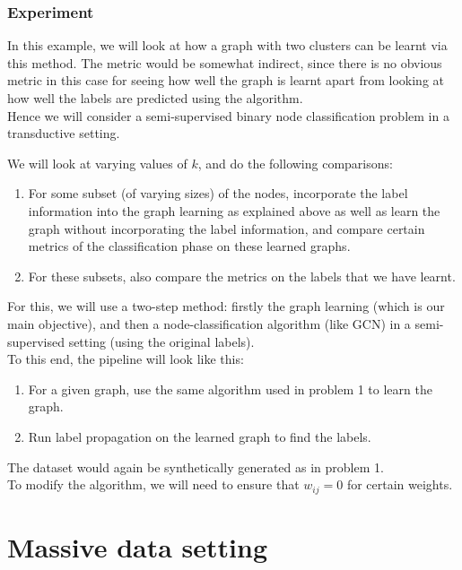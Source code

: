 \documentclass[a4paper]{article}
\newcommand{\nl}{\vspace{0.2cm}\\}
\begin{document}
\subsubsection{Experiment}

In this example, we will look at how a graph with two clusters can be learnt via this method. The metric would be somewhat indirect, since there is no obvious metric in this case for seeing how well the graph is
learnt apart from looking at how well the labels are predicted using the algorithm.\nl
Hence we will consider a semi-supervised binary node classification problem in a transductive setting.

We will look at varying values of $k$, and do the following comparisons:

\begin{enumerate}
    \item For some subset (of varying sizes) of the nodes, incorporate the label information into the graph learning as explained above as well as learn the graph without incorporating the
        label information, and compare certain metrics of the classification phase on these learned graphs.
    \item For these subsets, also compare the metrics on the labels that we have learnt.
\end{enumerate}

For this, we will use a two-step method: firstly the graph learning (which is our main objective), and then a node-classification algorithm (like GCN) in a semi-supervised setting (using the
original labels).\nl
To this end, the pipeline will look like this:
\begin{enumerate}
    \item For a given graph, use the same algorithm used in problem 1 to learn the graph.
    \item Run label propagation on the learned graph to find the labels.
\end{enumerate}
The dataset would again be synthetically generated as in problem 1.\nl
To modify the algorithm, we will need to ensure that $w_{ij} = 0$ for certain weights.


\newpage

\section{Massive data setting}
\end{document}

